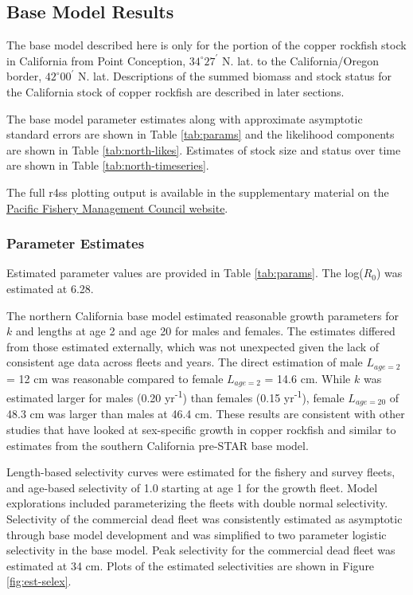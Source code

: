 \documentclass[11pt,
  letterpaper,
]{article}
\begin{document}
\subsection{Base Model Results}\label{base-model-results}

The base model described here is only for the portion of the copper rockfish stock in California from Point Conception, $34^\circ 27^\prime$ N. lat. to the California/Oregon border, $42^\circ 00^\prime$ N. lat. Descriptions of the summed biomass and stock status for the California stock of copper rockfish are described in later sections.

The base model parameter estimates along with approximate asymptotic standard errors are shown in Table \ref{tab:params} and the likelihood components are shown in Table \ref{tab:north-likes}. Estimates of stock size and status over time are shown in Table \ref{tab:north-timeseries}.

The full r4ss plotting output is available in the supplementary material on the \href{pcouncil.org}{Pacific Fishery Management Council website}.

\subsubsection{Parameter Estimates}\label{parameter-estimates}

Estimated parameter values are provided in Table \ref{tab:params}. The log(\(R_0\)) was estimated at 6.28.

The northern California base model estimated reasonable growth parameters for \(k\) and lengths at age 2 and age 20 for males and females. The estimates differed from those estimated externally, which was not unexpected given the lack of consistent age data across fleets and years. The direct estimation of male \(L_{age=2}\) = 12 cm was reasonable compared to female \(L_{age=2}\) = 14.6 cm. While \(k\) was estimated larger for males (0.20 yr\textsuperscript{-1}) than females (0.15 yr\textsuperscript{-1}), female \(L_{age=20}\) of 48.3 cm was larger than males at 46.4 cm. These results are consistent with other studies that have looked at sex-specific growth in copper rockfish and similar to estimates from the southern California pre-STAR base model.

Length-based selectivity curves were estimated for the fishery and survey fleets, and age-based selectivity of 1.0 starting at age 1 for the growth fleet. Model explorations included parameterizing the fleets with double normal selectivity. Selectivity of the commercial dead fleet was consistently estimated as asymptotic through base model development and was simplified to two parameter logistic selectivity in the base model. Peak selectivity for the commercial dead fleet was estimated at 34 cm. Plots of the estimated selectivities are shown in Figure \ref{fig:est-selex}.
\end{document}
